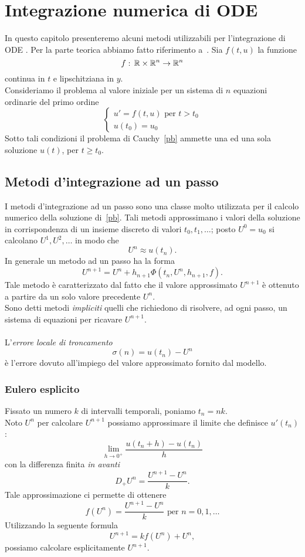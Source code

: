 \chapter{Integrazione numerica di ODE}
In questo capitolo presenteremo alcuni  metodi utilizzabili per l'integrazione  di ODE .  Per la parte teorica abbiamo fatto riferimento a~\cite[Capitoli 5-8]{LeVeque}. 
Sia $f(t,u)$ la funzione
$$ f:\, \mathbb{R} \times \mathbb{R}^n \to \mathbb{R}^n$$
continua in $t$ e lipschitziana in $y$.\\
Consideriamo il problema al valore iniziale per un sistema di $n$ equazioni ordinarie del primo ordine
\begin{equation} \label{pb}\begin{cases} u'= f(t,u) \text{ per } t>t_0\\
 u(t_0) = u_0	
 \end{cases}
 \end{equation}
 Sotto tali condizioni il problema di Cauchy~\eqref{pb} ammette una ed una sola soluzione $u(t)$, per $t\geq t_0$. 
 \section{Metodi d'integrazione ad un passo}
I metodi d'integrazione ad un passo sono una  classe  molto utilizzata per il calcolo numerico della soluzione di~\eqref{pb}. Tali metodi approssimano i valori della soluzione in corrispondenza di un insieme discreto di valori $t_0, t_1, \dots$; posto  $U^0 = u_0$  si calcolano $U^1, U^2, \dots$  in modo che $$U^n \approx u\left(t_n\right).$$ 
In generale un metodo ad un passo ha la forma
 $$ U^{n+1} = U^n   + h_{n+1} \Phi\left( t_n, U^n ,  h_{n+1},f\right).$$
Tale metodo \`e caratterizzato dal fatto che il valore approssimato $U^{n+1}$ \`e ottenuto a partire da un solo valore precedente $U^n$.\\
Sono detti metodi \textit{impliciti} quelli che richiedono di risolvere, ad ogni passo,  un sistema di equazioni per ricavare $U^{n+1}$.\\ \\
L'\textit{errore locale di troncamento}  
$$ \sigma(n) = u(t_n) -U^n $$ 
\`e l'errore dovuto all'impiego del valore approssimato fornito dal modello.  

 \subsection{Eulero esplicito}
Fissato un numero $k$ di intervalli temporali, poniamo 
$t_n = nk$.\\ 
Noto $U^n$ per calcolare $U^{n+1}$ possiamo approssimare  il limite che definisce $u'\left(t_n\right)$:
$$ \lim_{h\to 0^+} \frac{u\left(t_n + h\right) - u\left(t_n\right)}{h}$$ 
con la differenza finita \emph{in avanti}
$$ D_+ U^n = \frac{U^{n+1}-U^n}{k}.$$
Tale approssimazione ci permette di ottenere
$$ f\left(U^n\right) = \frac{U^{n+1}-U^n}{k} \text{ per } n=0, 1, \dots $$
Utilizzando la seguente formula
$$ U^{n+1} = k f\left(U^n\right) + U^n,$$
possiamo calcolare esplicitamente $U^{n+1}$.
